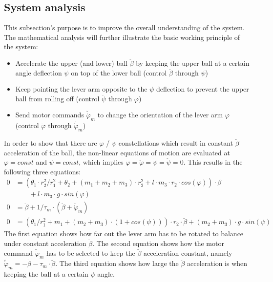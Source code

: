 \documentclass{article}
\begin{document}
\subsection{System analysis}
\label{ss:systemanalysis}
This subsection's purpose is to improve the overall understanding of the system.
The mathematical analysis will further illustrate the basic working principle of the system:
\begin{itemize}
	\item Accelerate the upper (and lower) ball $\ddot{\beta}$ by keeping the upper ball at a certain angle deflection $\psi$ on top of the lower ball (control $\ddot{\beta}$ through $\psi$)
	\item Keep pointing the lever arm opposite to the $\psi$ deflection to prevent the upper ball from rolling off (control $\ddot{\psi}$ through $\varphi$)
	\item Send motor commands $\breve{\dot{\varphi}}_m$ to change the orientation of the lever arm $\varphi$ (control $\ddot{\varphi}$ through $\breve{\dot{\varphi}}_m$)
\end{itemize}
In order to show that there are $\varphi$ / $\psi$ constellations which result in constant $\ddot{\beta}$ acceleration of the ball, the non-linear equations of motion are evaluated at $\varphi = const$ and $\psi = const$, which implies $\dot{\varphi} = \ddot{\varphi} = \dot{\psi} = \ddot{\psi} = 0$.
This results in the following three equations:
\begin{align}
0 &= \left(\theta_1 \cdot r_2^2/r_1^2 + \theta_2 + (m_1 + m_2 + m_3) \cdot r_2^2 + l \cdot m_3 \cdot r_2 \cdot cos(\varphi) \right) \cdot \ddot{\beta}  \nonumber \\
&\qquad  + l \cdot m_3 \cdot g \cdot sin(\varphi) \label{eq:phi_betaddot_relation} \\
0 &= \ddot{\beta} + 1/\tau_m \cdot (\dot{\beta} + \breve{\dot{\varphi}}_m) \\
0 &= (\theta_1/r_1^2  + m_1 + (m_2+m_3) \cdot (1+cos(\psi))) \cdot r_2 \cdot \ddot{\beta} + (m_2+m_3) \cdot g \cdot sin(\psi)
\label{eq:psi_betaddot_relation}
\end{align}
The first equation shows how far out the lever arm has to be rotated to balance under constant acceleration $\ddot{\beta}$.
The second equation shows how the motor command $\breve{\dot{\varphi}}_m$ has to be selected to keep the $\ddot{\beta}$ acceleration constant, namely $\breve{\dot{\varphi}}_m = -\dot{\beta} - \tau_m \cdot \ddot{\beta}$.
The third equation shows how large the $\ddot{\beta}$ acceleration is when keeping the ball at a certain $\psi$ angle.
\end{document}
